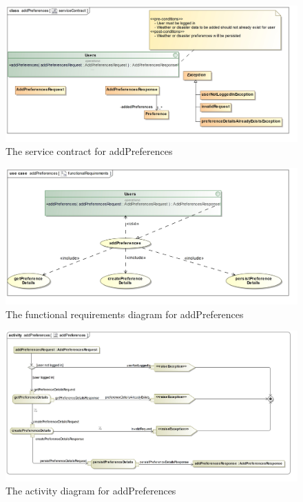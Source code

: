 \begin{figure}[H]
	\centering
	\includegraphics[scale=0.2]{../images/funcReq/addPreferencesServiceContract.jpg}
	\caption{The service contract for addPreferences \label{overflow}}
\end{figure}

\begin{figure}[H]
	\centering
	\includegraphics[scale=0.25]{../images/funcReq/addPreferencesFunctionalRequirements.jpg}
	\caption{The functional requirements diagram for addPreferences \label{overflow}}
\end{figure}

\begin{figure}[H]
	\centering
	\includegraphics[scale=0.16]{../images/funcReq/addPreferencesActivityDiagram.jpg}
	\caption{The activity diagram for addPreferences \label{overflow}}
\end{figure}

